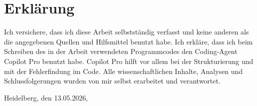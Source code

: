 \section*{Erklärung}

Ich versichere, dass ich diese Arbeit selbstständig verfasst und keine anderen als die angegebenen Quellen und Hilfsmittel benutzt habe. Ich erkläre, dass ich beim Schreiben des in der Arbeit verwendeten Programmcodes den Coding-Agent Copilot Pro benutzt habe. Copilot Pro hilft vor allem bei der Strukturierung und mit der Fehlerfindung im Code. Alle wissenschaftlichen Inhalte, Analysen und Schlussfolgerungen wurden von mir selbst erarbeitet und verantwortet.

Heidelberg, den 13.05.2026,

